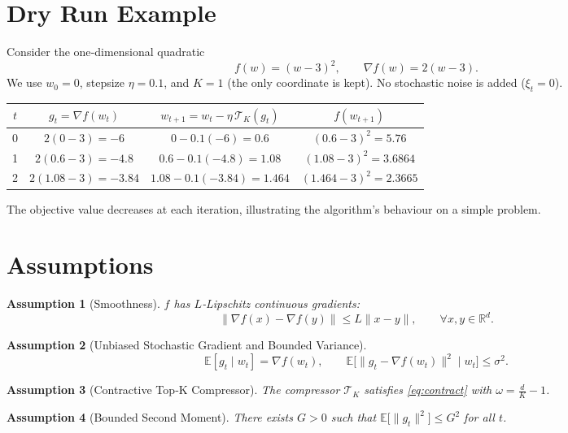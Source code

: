 \documentclass{article}
\newtheorem{assumption}{Assumption}
\newcommand{\TopK}{\mathcal{T}_K}
\newcommand{\E}{\mathbb{E}}
\newcommand{\R}{\mathbb{R}}
\begin{document}
\section*{Dry Run Example}
Consider the one‑dimensional quadratic
\[
f(w)=(w-3)^{2},
\qquad \nabla f(w)=2(w-3).
\]
We use $w_0=0$, stepsize $\eta=0.1$, and $K=1$ (the only coordinate is kept).  
No stochastic noise is added ($\xi_t=0$).

\begin{center}
\begin{tabular}{c|c|c|c}
$t$ & $g_t= \nabla f(w_t)$ & $w_{t+1}=w_t-\eta\,\TopK(g_t)$ & $f(w_{t+1})$\\ \hline
0 & $2(0-3)=-6$ & $0-0.1(-6)=0.6$ & $(0.6-3)^{2}=5.76$\\
1 & $2(0.6-3)=-4.8$ & $0.6-0.1(-4.8)=1.08$ & $(1.08-3)^{2}=3.6864$\\
2 & $2(1.08-3)=-3.84$ & $1.08-0.1(-3.84)=1.464$ & $(1.464-3)^{2}=2.3665$\\
\end{tabular}
\end{center}
The objective value decreases at each iteration, illustrating the algorithm’s behaviour on a simple problem.

\newpage
\section*{Assumptions}
\begin{assumption}[Smoothness]
\label{ass:smooth}
$f$ has $L$‑Lipschitz continuous gradients:
\[
\|\nabla f(x)-\nabla f(y)\|\le L\|x-y\|,\qquad\forall x,y\in\R^{d}.
\]
\end{assumption}
\begin{assumption}[Unbiased Stochastic Gradient and Bounded Variance]
\label{ass:unbiased}
\[
\E[g_t\mid w_t]=\nabla f(w_t),\qquad 
\E\!\big[\|g_t-\nabla f(w_t)\|^{2}\mid w_t\big]\le\sigma^{2}.
\]
\end{assumption}
\begin{assumption}[Contractive Top‑K Compressor]
\label{ass:compress}
The compressor $\TopK$ satisfies \eqref{eq:contract} with $\omega=\frac{d}{K}-1$.
\end{assumption}
\begin{assumption}[Bounded Second Moment]
\label{ass:bounded}
There exists $G>0$ such that $\E\!\big[\|g_t\|^{2}\big]\le G^{2}$ for all $t$.
\end{assumption}
\end{document}
